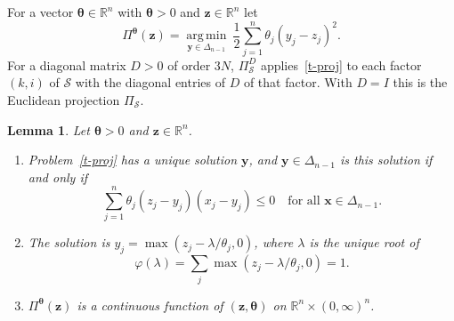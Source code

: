 \documentclass[11pt]{article}
\theoremstyle{plain}
\newtheorem{lemma}[theorem]{Lemma}
\theoremstyle{definition}
\theoremstyle{remark}
\renewcommand{\labelenumi}{\textbf{\arabic{enumi}.}}
\numberwithin{equation}{section}
\numberwithin{figure}{section}
\numberwithin{table}{section}
\begin{document}
For a vector $\bm\theta\in\mathbb{R}^n$ with $\bm\theta>0$ and
$\bm z\in\mathbb{R}^n$ let
\begin{equation}\label{t-proj}
\Pi^{\bm\theta}(\bm z)=\operatorname*{arg\,min}_{\bm y\in\Delta_{n-1}}\
\frac12\sum_{j=1}^n \theta_j\left(y_j-z_j\right)^2 .
\end{equation}
For a diagonal matrix $D>0$ of order $3N$, $\Pi^D_{\mathcal{S}}$
applies~\eqref{t-proj} to each factor $(k,i)$ of $\mathcal{S}$ with the
diagonal entries of $D$ of that factor. With $D=I$ this is the Euclidean
projection $\Pi_{\mathcal{S}}$.

\begin{lemma}\label{t-proj-prop}
Let $\bm\theta>0$ and $\bm z\in\mathbb{R}^n$.
\begin{enumerate}
\renewcommand{\labelenumi}{(\alph{enumi})}
\item Problem~\eqref{t-proj} has a unique solution $\bm y$, and
$\bm y\in\Delta_{n-1}$ is this solution if and only if
\begin{equation}\label{t-vi}
\sum_{j=1}^n \theta_j\left(z_j-y_j\right)\left(x_j-y_j\right)\le 0
\quad\text{for all }\bm x\in\Delta_{n-1}.
\end{equation}
\item The solution is $y_j=\max\left(z_j-\lambda/\theta_j,0\right)$, where
$\lambda$ is the unique root of
\begin{equation*}
\varphi(\lambda)=\sum_j\max\left(z_j-\lambda/\theta_j,0\right)=1 .
\end{equation*}
\item $\Pi^{\bm\theta}(\bm z)$ is a continuous function of $(\bm z,\bm\theta)$
on $\mathbb{R}^n\times(0,\infty)^n$.
\end{enumerate}
\end{lemma}
\end{document}
